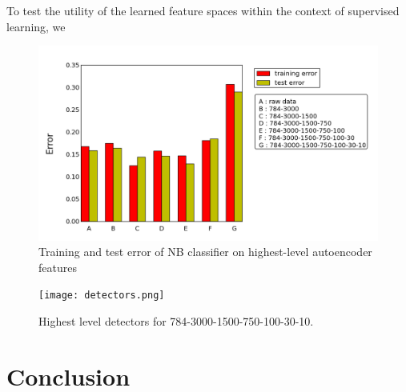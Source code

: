 \documentclass{article}
\begin{document}
To test the utility of the learned feature spaces within the context of supervised learning, we 

\begin{figure}[htbp!]
    \centering
    \includegraphics[width=\textwidth]{trainingAndTestError.png}
    \caption{Training and test error of NB classifier on highest-level autoencoder features}
    \label{fig:error}
\end{figure}%

\begin{figure}[htbp!]
    \centering
    \texttt{[image: detectors.png]}
    \caption{Highest level detectors for 784-3000-1500-750-100-30-10.}
    \label{fig:detectors}
\end{figure}%

\section{Conclusion}\label{sec:conclusion}

\nocite{*}
{}

\end{document}
